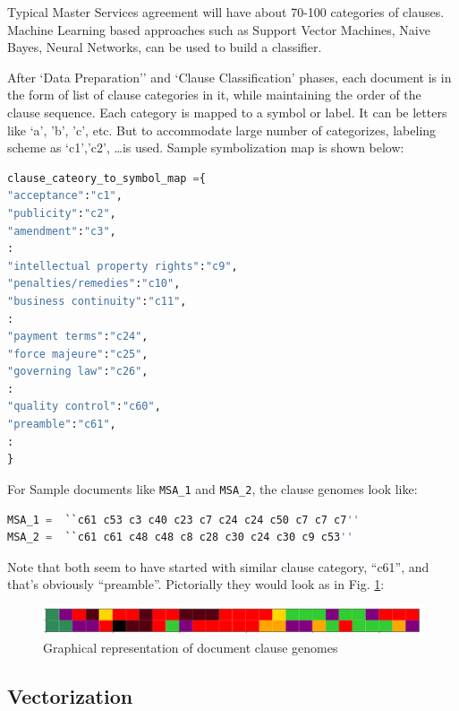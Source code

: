 \documentclass[journal]{journal}
\begin{document}
Typical Master Services agreement will have about 70-100 categories of clauses. Machine Learning based approaches such as Support Vector Machines, Naive Bayes, Neural Networks, can be used to build a classifier. 

After `Data Preparation'' and `Clause Classification' phases, each document is in the form of list of clause categories in it, while maintaining the order of the clause sequence. Each category is mapped to a symbol or label. It can be letters like `a', 'b', 'c', etc. But to accommodate large number of categorizes, labeling scheme as `c1','c2', \ldots is used. Sample symbolization map is shown below:

\begin{lstlisting}[language=Python, basicstyle=\footnotesize ]
clause_cateory_to_symbol_map ={ 
"acceptance":"c1", 
"publicity":"c2", 
"amendment":"c3", 
:
"intellectual property rights":"c9", 
"penalties/remedies":"c10", 
"business continuity":"c11", 
:
"payment terms":"c24", 
"force majeure":"c25", 
"governing law":"c26", 
:
"quality control":"c60", 
"preamble":"c61", 
:
}
\end{lstlisting}

For Sample documents like \lstinline|MSA_1| and \lstinline|MSA_2|, the clause genomes look like:
\begin{lstlisting}[language=Python, basicstyle=\footnotesize ]
MSA_1 =  ``c61 c53 c3 c40 c23 c7 c24 c24 c50 c7 c7 c7''
MSA_2 =  ``c61 c61 c48 c48 c8 c28 c30 c24 c30 c9 c53''
\end{lstlisting}

Note that both seem to have started with similar clause category, ``c61'', and that's obviously ``preamble''. Pictorially they would look as in Fig. \ref{fig:docclausegenome}:

 \begin{figure}[h!]
 \begin{center}
  \includegraphics[width=\linewidth,keepaspectratio]{img/two_genomes.png}
  \caption{Graphical representation of document clause genomes}
  \label{fig:docclausegenome}
 \end{center}
 \end{figure}


\subsection{Vectorization}
\label{subsec:vecrtorization}
\end{document}
